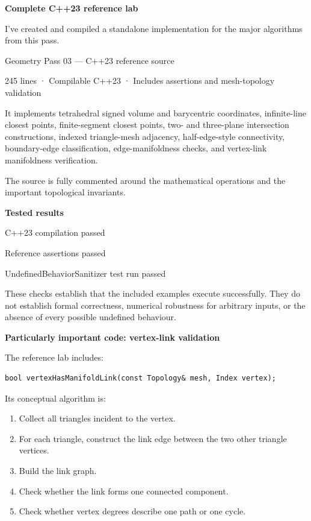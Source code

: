 \hypertarget{04-visual-computing-ii-ch023-part-viii-reference-implementation-and-repository-verification}{}

\textbf{Complete C++23 reference lab}

I've created and compiled a standalone implementation for the major algorithms from this pass.

Geometry Pass 03 --- C++23 reference source

245 lines · Compilable C++23 · Includes assertions and mesh-topology validation

It implements tetrahedral signed volume and barycentric coordinates, infinite-line closest points, finite-segment closest points, two- and three-plane intersection constructions, indexed triangle-mesh adjacency, half-edge-style connectivity, boundary-edge classification, edge-manifoldness checks, and vertex-link manifoldness verification.

The source is fully commented around the mathematical operations and the important topological invariants.

\textbf{Tested results}

C++23 compilation passed

Reference assertions passed

UndefinedBehaviorSanitizer test run passed

These checks establish that the included examples execute successfully. They do not establish formal correctness, numerical robustness for arbitrary inputs, or the absence of every possible undefined behaviour.

\textbf{Particularly important code: vertex-link validation}

The reference lab includes:

\begin{verbatim}
bool vertexHasManifoldLink(const Topology& mesh, Index vertex);
\end{verbatim}

Its conceptual algorithm is:

\begin{enumerate}
\def\labelenumi{\arabic{enumi}.}
\tightlist
\item
  Collect all triangles incident to the vertex.
\item
  For each triangle, construct the link edge between the two other triangle vertices.
\item
  Build the link graph.
\item
  Check whether the link forms one connected component.
\item
  Check whether vertex degrees describe one path or one cycle.
\end{enumerate}

